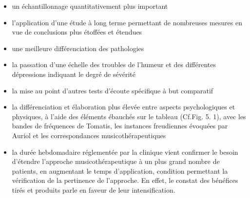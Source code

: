 \begin{itemize}

\item un échantillonnage quantitativement plus important

\item  l'application d'une étude à long terme permettant de nombreuses
  mesures en vue de conclusions plus étoffées et étendues

   \item  une meilleure différenciation des pathologies
   \item la passation d'une échelle des troubles de l'humeur et des différentes
       dépressions indiquant le degré de sévérité
     \item la mise au point  d'autres tests d'écoute spécifique à but
       comparatif
     \item la différenciation et élaboration plus élevée entre aspects
       psychologiques et physiques, à l'aide des éléments ébauchés sur
       le tableau (Cf.Fig. 5. 1), avec les bandes de fréquences de
       Tomatis, les instances freudiennes évoquées par Auriol et
       les correspondances musicothérapeutiques








     \item la durée hebdomadaire réglementée par la clinique vient
       confirmer le besoin d'étendre l'approche musicothérapeutique à
       un plus grand nombre de patients, en augmentant le temps
       d'application, condition permettant la vérification de la
       pertinence de l'approche. En effet, le constat des bénéfices
       tirés et
       produits parle en faveur de leur intensification.




\end{itemize}
